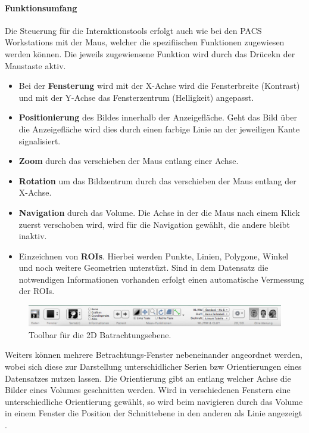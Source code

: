 \paragraph{Funktionsumfang}
Die Steuerung für die Interaktionstools erfolgt auch wie bei den PACS Workstations mit der Maus, 
welcher die spezifiischen Funktionen zugewiesen werden können. Die jeweils zugewiensene Funktion wird durch das Drücekn der Maustaste aktiv.
\begin{itemize}
	\item Bei der \textbf{Fensterung} wird mit der X-Achse wird die Fensterbreite (Kontrast) und mit der Y-Achse das Fensterzentrum (Helligkeit) angepasst.
	\item \textbf{Positionierung} des Bildes innerhalb der Anzeigefläche. Geht das Bild über die Anzeigefläche wird dies durch einen farbige Linie an der jeweiligen Kante signalisiert.
	\item \textbf{Zoom} durch das verschieben der Maus entlang einer Achse.
	\item \textbf{Rotation} um das Bildzentrum durch das verschieben der Maus entlang der X-Achse.
	\item \textbf{Navigation} durch das Volume. Die Achse in der die Maus nach einem Klick zuerst verschoben wird, wird für die Navigation gewählt, die andere bleibt inaktiv.
	\item Einzeichnen von \textbf{ROIs}. Hierbei werden Punkte, Linien, Polygone, Winkel und noch weitere Geometrien unterstüzt. 
		Sind in dem Datensatz die notwendigen Informationen vorhanden erfolgt einen automatische Vermessung der ROIs.
\end{itemize}
\begin{figure}[t]
	\centering
	\includegraphics[width=0.8\linewidth]{img/c2_osirix_2d_view_toolbar.jpg}
	\caption{Toolbar für die 2D Batrachtungsebene.}
\end{figure}
Weiters können mehrere Betrachtungs-Fenster nebeneinander angeordnet werden, wobei sich diese zur Darstellung unterschidlicher Serien bzw Orientierungen eines Datensatzes nutzen lassen. 
Die Orientierung gibt an entlang welcher Achse die Bilder eines Volumes geschnitten werden.
Wird in verschiedenen Fenstern eine unterschiedliche Orientierung gewählt,
so wird beim navigieren durch das Volume in einem Fenster die Position der Schnittebene in den anderen als Linie angezeigt \cite{osirix}.
